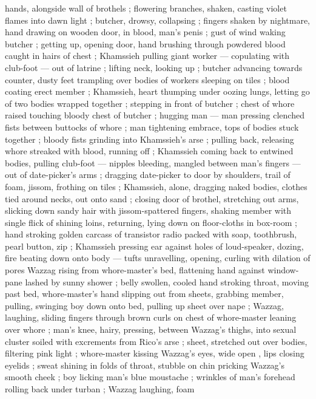hands, alongside wall of brothels ; flowering branches, shaken, casting violet flames into dawn
light ; butcher, drowsy, collapsing ; fingers shaken by nightmare, hand drawing on wooden door, in
blood, man's penis ; gust of wind waking butcher ; getting up, opening door, hand brushing through
powdered blood caught in hairs of chest ; Khamssieh pulling giant worker --- copulating with
club-foot --- out of latrine ; lifting neck, looking up ; butcher advancing towards counter, dusty
feet trampling over bodies of workers sleeping on tiles ; blood coating erect member ; Khamssieh,
heart thumping under oozing lungs, letting go of two bodies wrapped together ; stepping in front of
butcher ; chest of whore raised touching bloody chest of butcher ; hugging man --- man pressing
clenched fists between buttocks of whore ; man tightening embrace, tops of bodies stuck together ;
bloody fists grinding into Khamssieh's arse ; pulling back, releasing whore streaked with blood,
running off ; Khamssieh coming back to entwined bodies, pulling club-foot --- nipples bleeding,
mangled between man's fingers --- out of date-picker's arms ; dragging date-picker to door by
shoulders, trail of foam, jissom, frothing on tiles ; Khamssieh, alone, dragging naked bodies,
clothes tied around necks, out onto sand ; closing door of brothel, stretching out arms, slicking
down sandy hair with jissom-spattered fingers, shaking member with single flick of shining loins,
returning, lying down on floor-cloths in box-room ; hand stroking golden carcass of transistor radio
packed with soap, toothbrush, pearl button, zip ; Khamssieh pressing ear against holes of
loud-speaker, dozing, fire beating down onto body --- tufts unravelling, opening, curling with
dilation of pores {\semislash} Wazzag rising from whore-master's bed, flattening hand against
window-pane lashed by sunny shower ; %
belly swollen, cooled hand stroking throat, moving past bed, whore-master's hand slipping out from
sheets, grabbing member, pulling, swinging boy down onto bed, pulling up sheet over nape ; Wazzag,
laughing, sliding fingers through brown curls on chest of whore-master leaning over whore ; man's
knee, hairy, pressing, between Wazzag's thighs, into sexual cluster soiled with excrements from
Rico's arse ; sheet, stretched out over bodies, filtering pink light ; whore-master kissing Wazzag's
eyes, wide open{\td} , lips closing eyelids ;
sweat shining in folds of throat, stubble on chin pricking Wazzag's smooth cheek ; boy licking man's
blue moustache ; wrinkles of man's forehead rolling back under turban ; Wazzag laughing, foam
